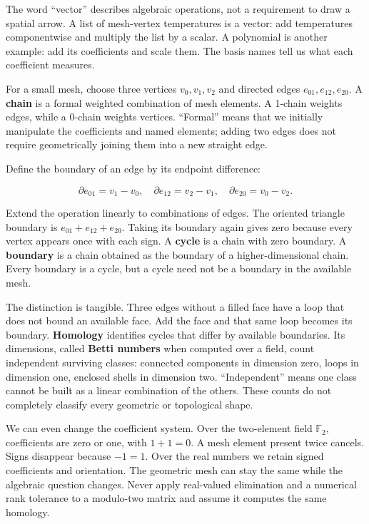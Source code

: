 The word ``vector'' describes algebraic operations, not a requirement to draw a spatial arrow. A list of mesh-vertex temperatures is a vector: add temperatures componentwise and multiply the list by a scalar. A polynomial is another example: add its coefficients and scale them. The basis names tell us what each coefficient measures.

For a small mesh, choose three vertices \(v_0,v_1,v_2\) and directed edges \(e_{01},e_{12},e_{20}\). A \textbf{chain} is a formal weighted combination of mesh elements. A 1-chain weights edges, while a 0-chain weights vertices. ``Formal'' means that we initially manipulate the coefficients and named elements; adding two edges does not require geometrically joining them into a new straight edge.

Define the boundary of an edge by its endpoint difference:

\[
\partial e_{01}=v_1-v_0,\quad
\partial e_{12}=v_2-v_1,\quad
\partial e_{20}=v_0-v_2.
\]

Extend the operation linearly to combinations of edges. The oriented triangle boundary is \(e_{01}+e_{12}+e_{20}\). Taking its boundary again gives zero because every vertex appears once with each sign. A \textbf{cycle} is a chain with zero boundary. A \textbf{boundary} is a chain obtained as the boundary of a higher-dimensional chain. Every boundary is a cycle, but a cycle need not be a boundary in the available mesh.

The distinction is tangible. Three edges without a filled face have a loop that does not bound an available face. Add the face and that same loop becomes its boundary. \textbf{Homology} identifies cycles that differ by available boundaries. Its dimensions, called \textbf{Betti numbers} when computed over a field, count independent surviving classes: connected components in dimension zero, loops in dimension one, enclosed shells in dimension two. ``Independent'' means one class cannot be built as a linear combination of the others. These counts do not completely classify every geometric or topological shape.

We can even change the coefficient system. Over the two-element field \(\mathbb F_2\), coefficients are zero or one, with \(1+1=0\). A mesh element present twice cancels. Signs disappear because \(-1=1\). Over the real numbers we retain signed coefficients and orientation. The geometric mesh can stay the same while the algebraic question changes. Never apply real-valued elimination and a numerical rank tolerance to a modulo-two matrix and assume it computes the same homology.

